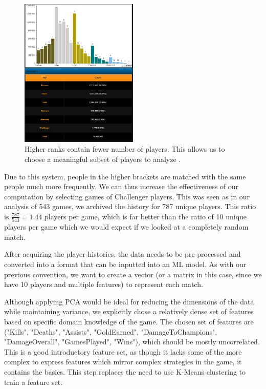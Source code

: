 \begin{figure}[t!]
  \centering
    \includegraphics[width=0.5\textwidth]{rankedbreakdown}
  \caption{Higher ranks contain fewer number of players.  This allows us to choose a meaningful subset of players to analyze \cite{8_lolsummoners_2015}. }
  \label{fig:rankedbreakdown}
\end{figure}

Due to this system, people in the higher brackets are matched with the same people much more frequently. We can thus increase the effectiveness of our computation by selecting games of Challenger players. This was seen as in our analysis of 543 games, we archived the history for 787 unique players. This ratio is $\frac{787}{543} = 1.44$ players per game, which is far better than the ratio of 10 unique players per game which we would expect if we looked at a completely random match. 

After acquiring the player histories, the data needs to be pre-processed and converted into a format that can be inputted into an ML model.  As with our previous convention, we want to create a vector (or a matrix in this case, since we have 10 players and multiple features) to represent each match. 

Although applying PCA would be ideal for reducing the dimensions of the data while maintaining variance, we explicitly chose a relatively dense set of features based on 
specific domain knowledge of the game.  The chosen set of features are ("Kills", "Deaths", "Assists", "GoldEarned", "DamageToChampions", "DamageOverall", "GamesPlayed", "Wins"), which should be mostly uncorrelated. This is a good introductory feature set, as though it lacks some of the more complex to express features which mirror complex strategies in the game, it contains the basics.  This step replaces the need to use K-Means clustering to train a feature set. 

